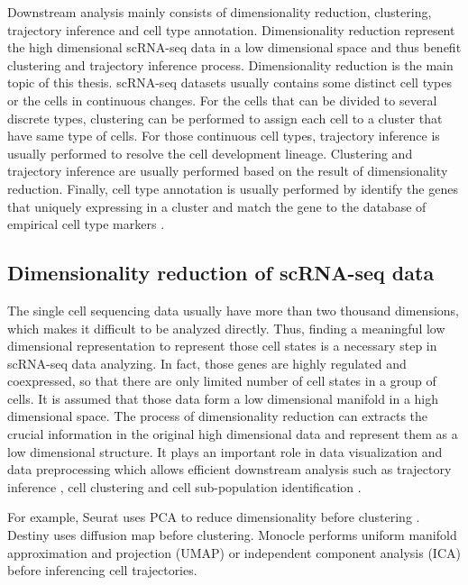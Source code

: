 Downstream analysis mainly consists of dimensionality reduction, clustering, trajectory inference and cell type annotation. Dimensionality reduction represent the high dimensional scRNA-seq data in a low dimensional space and thus benefit clustering and trajectory inference process. Dimensionality reduction is the main topic of this thesis. scRNA-seq datasets usually contains some distinct cell types or the cells in continuous changes. For the cells that can be divided to several discrete types, clustering can be performed to assign each cell to a cluster that have same type of cells. For those continuous cell types, trajectory inference is usually performed to resolve the cell development lineage. Clustering and trajectory inference are usually performed based on the result of dimensionality reduction. Finally, cell type annotation is usually performed by identify the genes that uniquely expressing in a cluster and match the gene to the database of empirical cell type markers \cite{abdelaal2019comparison}. 


\subsection{Dimensionality reduction of scRNA-seq data}

The single cell sequencing data usually have more than two thousand dimensions, which makes it difficult to be analyzed directly. Thus, finding a meaningful low dimensional representation to represent those cell states is a necessary step in scRNA-seq data analyzing. In fact, those genes are highly regulated and coexpressed, so that there are only limited number of cell states in a group of cells. It is assumed that those data form a low dimensional manifold in a high dimensional space. The process of dimensionality reduction can extracts the crucial information in the original high dimensional data and represent them as a low dimensional structure.  It plays an important role in data visualization and data preprocessing which allows efficient downstream analysis such as trajectory inference \cite{Saelens2019}, cell clustering \cite{weber2016comparison} and cell sub-population identification \cite{Hwang2018}. 

For example, Seurat uses PCA \cite{Abdi2010} to reduce dimensionality before clustering \cite{Satija2015}. Destiny \cite{angerer2016destiny} uses diffusion map before clustering. Monocle \cite{Qiu2017} performs uniform manifold approximation and projection (UMAP) \cite{McInnes2018} or independent component analysis (ICA) \cite{hyvarinen2000independent} before inferencing cell trajectories. 

